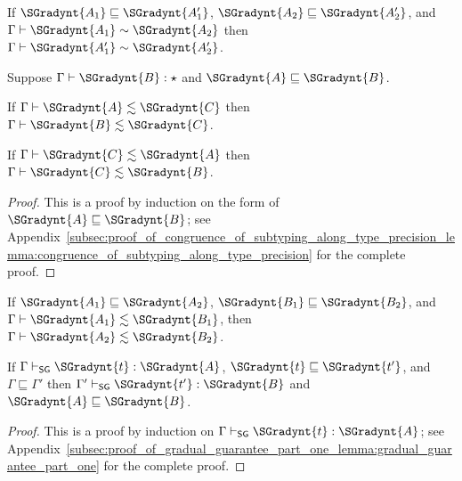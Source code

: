 \begin{corollary}
  \label{corollary:congruence_of_type_consistency_along_type_precision}
  If $ \SGradynt{A_{{\mathrm{1}}}}  \sqsubseteq  \SGradynt{A'_{{\mathrm{1}}}} $, $ \SGradynt{A_{{\mathrm{2}}}}  \sqsubseteq  \SGradynt{A'_{{\mathrm{2}}}} $, and $ \Gamma  \vdash  \SGradynt{A_{{\mathrm{1}}}}  \sim  \SGradynt{A_{{\mathrm{2}}}} $ then
  $ \Gamma  \vdash  \SGradynt{A'_{{\mathrm{1}}}}  \sim  \SGradynt{A'_{{\mathrm{2}}}} $.  
\end{corollary}

\begin{lemma}
  \label{lemma:congruence_of_subtyping_along_type_precision}
  Suppose $ \Gamma  \vdash  \SGradynt{B}  : \star $ and $ \SGradynt{A}  \sqsubseteq  \SGradynt{B} $.
  \begin{enumR}
  \item If $ \Gamma  \vdash  \SGradynt{A}  \lesssim  \SGradynt{C} $ then $ \Gamma  \vdash  \SGradynt{B}  \lesssim  \SGradynt{C} $.

  \item If $ \Gamma  \vdash  \SGradynt{C}  \lesssim  \SGradynt{A} $ then $ \Gamma  \vdash  \SGradynt{C}  \lesssim  \SGradynt{B} $.  
  \end{enumR}
\end{lemma}
\begin{proof}
  This is a proof by induction on the form of $ \SGradynt{A}  \sqsubseteq  \SGradynt{B} $; see
  Appendix~\ref{subsec:proof_of_congruence_of_subtyping_along_type_precision_lemma:congruence_of_subtyping_along_type_precision}
  for the complete proof.
\end{proof}

\begin{corollary}
  \label{corollary:congruence_of_subtyping_along_type_precision}
  If $ \SGradynt{A_{{\mathrm{1}}}}  \sqsubseteq  \SGradynt{A_{{\mathrm{2}}}} $, $ \SGradynt{B_{{\mathrm{1}}}}  \sqsubseteq  \SGradynt{B_{{\mathrm{2}}}} $, and $ \Gamma  \vdash  \SGradynt{A_{{\mathrm{1}}}}  \lesssim  \SGradynt{B_{{\mathrm{1}}}} $, then $ \Gamma  \vdash  \SGradynt{A_{{\mathrm{2}}}}  \lesssim  \SGradynt{B_{{\mathrm{2}}}} $.
\end{corollary}

\begin{lemma}
  \label{lemma:gradual_guarantee_part_one}
  If $ \Gamma  \vdash_{\mathsf{SG} }  \SGradynt{t}  :  \SGradynt{A} $, $ \SGradynt{t}  \sqsubseteq  \SGradynt{t'} $, and $ \Gamma  \sqsubseteq  \Gamma' $ then $ \Gamma'  \vdash_{\mathsf{SG} }  \SGradynt{t'}  :  \SGradynt{B} $ and $ \SGradynt{A}  \sqsubseteq  \SGradynt{B} $.
\end{lemma}
\begin{proof}
  This is a proof by induction on $ \Gamma  \vdash_{\mathsf{SG} }  \SGradynt{t}  :  \SGradynt{A} $; see
  Appendix~\ref{subsec:proof_of_gradual_guarantee_part_one_lemma:gradual_guarantee_part_one}
  for the complete proof.
\end{proof}

